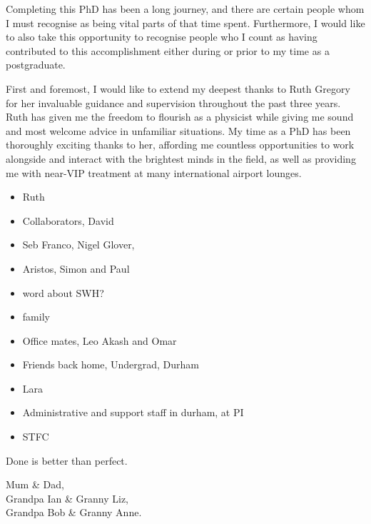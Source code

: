 \documentclass[
twoside,
openright,
frontopenright,
]{dmathesis}
\begin{document}
\begin{acknowledgements*}
  Completing this PhD has been a long journey, and there are certain people whom
  I must recognise as being vital parts of that time spent. Furthermore, I would
  like to also take this opportunity to recognise people who I count as having
  contributed to this accomplishment either during or prior to my time as a
  postgraduate.

  First and foremost, I would like to extend my deepest thanks to Ruth Gregory
  for her invaluable guidance and supervision throughout the past three
  years. Ruth has given me the freedom to flourish as a physicist while giving
  me sound and most welcome advice in unfamiliar situations. My time as a PhD
  has been thoroughly exciting thanks to her, affording me countless
  opportunities to work alongside and interact with the brightest minds in the
  field, as well as providing me with near-VIP treatment at many international
  airport lounges. 
  
  \begin{itemize}
  \item Ruth
  \item Collaborators, David
  \item Seb Franco, Nigel Glover,
  \item Aristos, Simon and Paul
  \item word about SWH?
  \item family
  \item Office mates, Leo Akash and Omar
  \item Friends back home, Undergrad, Durham
  \item Lara
  \item Administrative and support staff in durham, at PI
  \item STFC
  \end{itemize}
%
\end{acknowledgements*}

\begin{epigraph*}
%
  Done is better than perfect.
%
\end{epigraph*}

\begin{dedication*}
%
  Mum \& Dad,\\ Grandpa Ian \& Granny Liz,\\ Grandpa Bob \& Granny Anne.
%
\end{dedication*}
\end{document}
